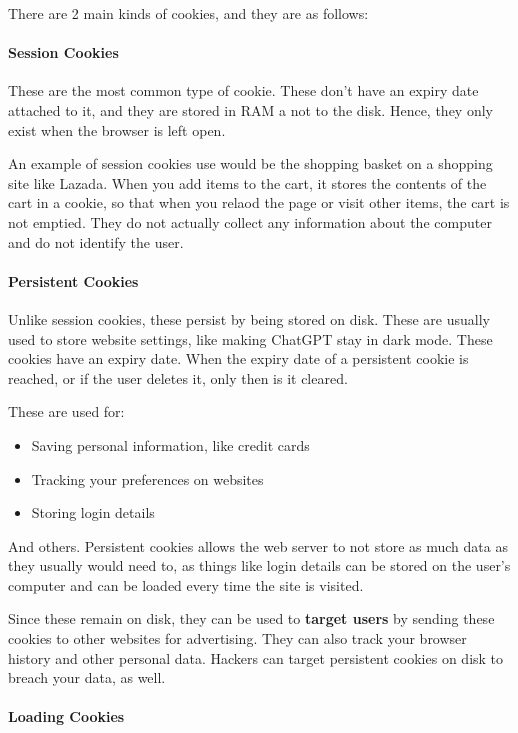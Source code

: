 \documentclass[../main.tex]{subfiles}
\begin{document}
There are 2 main kinds of cookies, and they are as follows:

\paragraph{Session Cookies}

These are the most common type of cookie. These don't have an expiry date attached to it, and they are stored in RAM a not to the disk. Hence, they only exist when the browser is left open.

An example of session cookies use would be the shopping basket on a shopping site like Lazada. When you add items to the cart, it stores the contents of the cart in a cookie, so that when you relaod the page or visit other items, the cart is not emptied. They do not actually collect any information about the computer and do not identify the user.

\paragraph{Persistent Cookies}

Unlike session cookies, these persist by being stored on disk. These are usually used to store website settings, like making ChatGPT stay in dark mode. These cookies have an expiry date. When the expiry date of a persistent cookie is reached, or if the user deletes it, only then is it cleared.

These are used for:

\begin{itemize}
    \item Saving personal information, like credit cards
    \item Tracking your preferences on websites
    \item Storing login details
\end{itemize}

And others. Persistent cookies allows the web server to not store as much data as they usually would need to, as things like login details can be stored on the user's computer and can be loaded every time the site is visited.

Since these remain on disk, they can be used to \textbf{target users} by sending these cookies to other websites for advertising. They can also track your browser history and other personal data. Hackers can target persistent cookies on disk to breach your data, as well.

\paragraph{Loading Cookies}
\end{document}
